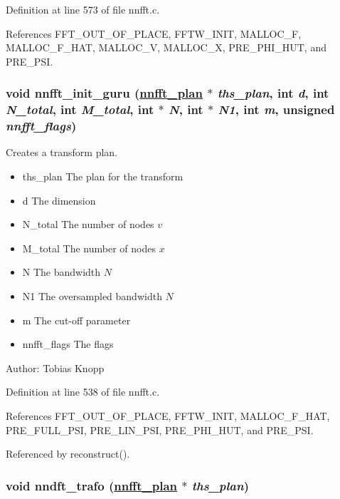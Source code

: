 Definition at line 573 of file nnfft.c.

References FFT\_\-OUT\_\-OF\_\-PLACE, FFTW\_\-INIT, MALLOC\_\-F, MALLOC\_\-F\_\-HAT, MALLOC\_\-V, MALLOC\_\-X, PRE\_\-PHI\_\-HUT, and PRE\_\-PSI.\hypertarget{group__nnfft_ga1}{
\subsubsection[nnfft\_\-init\_\-guru]{\setlength{\rightskip}{0pt plus 5cm}void nnfft\_\-init\_\-guru (\hyperlink{structnnfft__plan}{nnfft\_\-plan} $\ast$ {\em ths\_\-plan}, int {\em d}, int {\em N\_\-total}, int {\em M\_\-total}, int $\ast$ {\em N}, int $\ast$ {\em N1}, int {\em m}, unsigned {\em nnfft\_\-flags})}}
\label{group__nnfft_ga1}


Creates a transform plan. 

\begin{itemize}
\item ths\_\-plan The plan for the transform \item d The dimension \item N\_\-total The number of nodes $v$ \item M\_\-total The number of nodes $x$ \item N The bandwidth $N$ \item N1 The oversampled bandwidth $N$ \item m The cut-off parameter \item nnfft\_\-flags The flags\end{itemize}
\begin{Desc}
\item[Author:]Tobias Knopp \end{Desc}


Definition at line 538 of file nnfft.c.

References FFT\_\-OUT\_\-OF\_\-PLACE, FFTW\_\-INIT, MALLOC\_\-F\_\-HAT, PRE\_\-FULL\_\-PSI, PRE\_\-LIN\_\-PSI, PRE\_\-PHI\_\-HUT, and PRE\_\-PSI.

Referenced by reconstruct().\hypertarget{group__nnfft_ga2}{
\subsubsection[nndft\_\-trafo]{\setlength{\rightskip}{0pt plus 5cm}void nndft\_\-trafo (\hyperlink{structnnfft__plan}{nnfft\_\-plan} $\ast$ {\em ths\_\-plan})}}
\label{group__nnfft_ga2}



